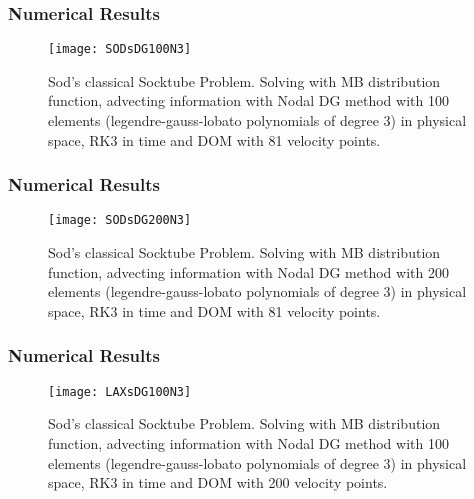 
\begin{frame}
	\frametitle{Numerical Results}
			
		\begin{figure}
			\centering
				\texttt{[image: SODsDG100N3]}
			\caption{Sod's classical Socktube Problem. Solving with MB distribution function, advecting information with Nodal DG method with 100 elements (legendre-gauss-lobato polynomials of degree 3) in physical space, RK3 in time and DOM with 81 velocity points.}
			\label{fig:SODsDG100N3}
		\end{figure}
	
\end{frame}

\begin{frame}
	\frametitle{Numerical Results}
			
		\begin{figure}
			\centering
				\texttt{[image: SODsDG200N3]}
			\caption{Sod's classical Socktube Problem. Solving with MB distribution function, advecting information with Nodal DG method with 200 elements (legendre-gauss-lobato polynomials of degree 3) in physical space, RK3 in time and DOM with 81 velocity points.}
			\label{fig:SODsDG200N3}
		\end{figure}
	
\end{frame}

\begin{frame}
	\frametitle{Numerical Results}
			
		\begin{figure}
			\centering
				\texttt{[image: LAXsDG100N3]}
			\caption{Sod's classical Socktube Problem. Solving with MB distribution function, advecting information with Nodal DG method with 100 elements (legendre-gauss-lobato polynomials of degree 3) in physical space, RK3 in time and DOM with 200 velocity points.}
			\label{fig:LAXsDG100N3}
		\end{figure}
	
\end{frame}
